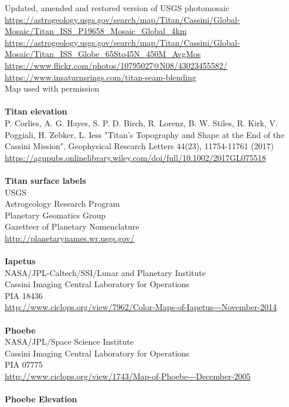 \documentclass[Orbiter User Manual.tex]{subfiles}
\begin{document}
Updated, amended and restored version of USGS photomosaic\\
\url{https://astrogeology.usgs.gov/search/map/Titan/Cassini/Global-Mosaic/Titan_ISS_P19658_Mosaic_Global_4km}\\
\url{https://astrogeology.usgs.gov/search/map/Titan/Cassini/Global-Mosaic/Titan_ISS_Globe_65Sto45N_450M_AvgMos}\\
\url{https://www.flickr.com/photos/10795027@N08/43023455582/}\\
\url{https://www.insaturnsrings.com/titan-seam-blending}\\
Map used with permission\\
\\
\textbf{Titan elevation}\\
P. Corlies, A. G. Hayes, S. P. D. Birch, R. Lorenz, B. W. Stiles, R. Kirk, V. Poggiali, H. Zebker, L. Iess "Titan's Topography and Shape at the End of the Cassini Mission", Geophysical Research Letters 44(23), 11754-11761 (2017)\\
\url{https://agupubs.onlinelibrary.wiley.com/doi/full/10.1002/2017GL075518}\\
\\
\textbf{Titan surface labels}\\
USGS\\
Astrogeology Research Program\\
Planetary Geomatics Group\\
Gazetteer of Planetary Nomenclature\\
\url{http://planetarynames.wr.usgs.gov/}\\
\\
\textbf{Iapetus}\\
NASA/JPL-Caltech/SSI/Lunar and Planetary Institute\\
Cassini Imaging Central Laboratory for Operations\\
PIA 18436\\
\url{http://www.ciclops.org/view/7962/Color-Maps-of-Iapetus---November-2014}\\
\\
\textbf{Phoebe}\\
NASA/JPL/Space Science Institute\\
Cassini Imaging Central Laboratory for Operations\\
PIA 07775\\
\url{http://www.ciclops.org/view/1743/Map-of-Phoebe---December-2005}\\
\\
\textbf{Phoebe Elevation}\\
\end{document}
